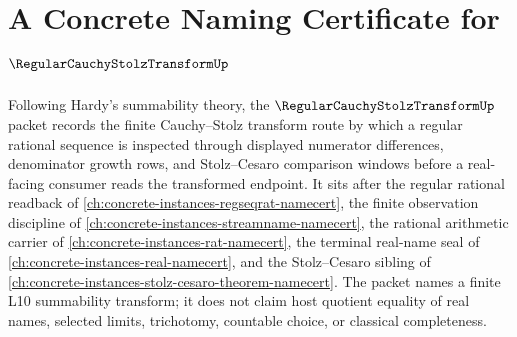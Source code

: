 \chapter{A Concrete Naming Certificate for $\RegularCauchyStolzTransformUp$}
\label{ch:concrete-instances-regular-cauchy-stolz-transform-namecert}

Following Hardy's summability theory, the $\RegularCauchyStolzTransformUp$ packet records the finite Cauchy--Stolz transform route by which a regular rational sequence is inspected through displayed numerator differences, denominator growth rows, and Stolz--Cesaro comparison windows before a real-facing consumer reads the transformed endpoint. It sits after the regular rational readback of \autoref{ch:concrete-instances-regseqrat-namecert}, the finite observation discipline of \autoref{ch:concrete-instances-streamname-namecert}, the rational arithmetic carrier of \autoref{ch:concrete-instances-rat-namecert}, the terminal real-name seal of \autoref{ch:concrete-instances-real-namecert}, and the Stolz--Cesaro sibling of \autoref{ch:concrete-instances-stolz-cesaro-theorem-namecert}. The packet names a finite L10 summability transform; it does not claim host quotient equality of real names, selected limits, trichotomy, countable choice, or classical completeness.

